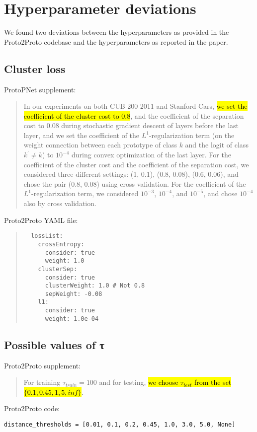 \appendix 
\section{Hyperparameter deviations}
We found two deviations between the hyperparameters as provided in the Proto2Proto codebase and the hyperparameters as reported in the paper.
\subsection{Cluster loss} \label{cluster}
ProtoPNet supplement: \begin{quote}In our experiments on both CUB-200-2011 and Stanford Cars, \hl{we set the coefficient of the cluster cost to 0.8}, and the coefficient of the separation cost to 0.08 during stochastic gradient descent of layers before the last layer, and we set the coefficient of the $L^1$-regularization term (on the weight connection between each prototype of class $k$ and the logit of class $k^\prime \neq k$) to $10^{−4}$ during convex optimization of the last layer. For the coefficient of the cluster cost and the coefficient of the separation cost, we considered three different settings: (1, 0.1), (0.8, 0.08), (0.6, 0.06), and chose the pair (0.8, 0.08) using cross validation. For the coefficient of the $L^1$-regularization term, we considered $10^{−3}$, $10^{−4}$,
and $10^{−5}$, and chose $10^{−4}$ also by cross validation.\end{quote} 
Proto2Proto YAML file:\begin{quote}
\begin{verbatim}
  lossList:
    crossEntropy:
      consider: true
      weight: 1.0
    clusterSep:
      consider: true
      clusterWeight: 1.0 # Not 0.8
      sepWeight: -0.08
    l1:
      consider: true
      weight: 1.0e-04    
\end{verbatim}
\end{quote}

\subsection{Possible values of τ} \label{tau}
Proto2Proto supplement:\begin{quote}
For training $\tau_{train} = 100$ and for testing, \hl{we choose $\tau_{test}$ from the set \\
$\{0.1, 0.45, 1, 5, inf \}$}.
\end{quote}

Proto2Proto code:

\begin{verbatim}
distance_thresholds = [0.01, 0.1, 0.2, 0.45, 1.0, 3.0, 5.0, None]
\end{verbatim}